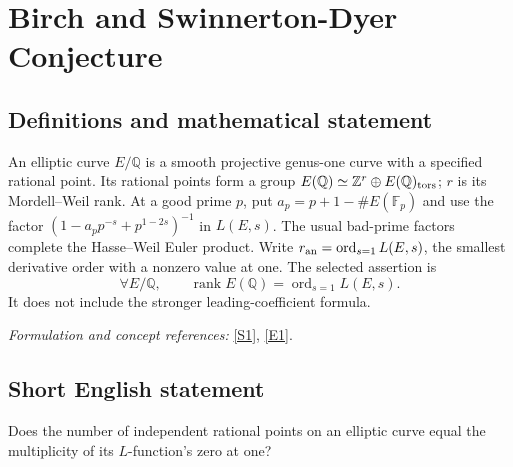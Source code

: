 \documentclass[11pt]{article}
\begin{document}
\section*{\texorpdfstring{Birch and Swinnerton-Dyer Conjecture}{Birch and Swinnerton-Dyer Conjecture}}\label{6}
\subsection{Definitions and mathematical statement}
An elliptic curve $E/{\mathbb{Q}}$ is a smooth projective genus-one curve with a specified rational point. Its rational points form a group $E({\mathbb{Q}})\simeq{\mathbb{Z}}^r\oplus E({\mathbb{Q}})_{\rm tors}$; $r$ is its Mordell--Weil rank. At a good prime $p$, put $a_p=p+1-\#E({\mathbb{F}}_p)$ and use the factor $(1-a_pp^{-s}+p^{1-2s})^{-1}$ in $L(E,s)$. The usual bad-prime factors complete the Hasse--Weil Euler product. Write $r_{\rm an}=\operatorname{ord}_{s=1}L(E,s)$, the smallest derivative order with a nonzero value at one. The selected assertion is
\[
 \forall E/{\mathbb{Q}},\qquad \operatorname{rank}E({\mathbb{Q}})=\operatorname{ord}_{s=1}L(E,s).
\]
It does not include the stronger leading-coefficient formula.
\par\smallskip\textit{Formulation and concept references:} \href{https://www.claymath.org/library/monographs/MPPc.pdf}{[S1]}, \href{https://www.claymath.org/wp-content/uploads/2022/05/birchswin.pdf}{[E1]}.

\subsection{Short English statement}
Does the number of independent rational points on an elliptic curve equal the multiplicity of its $L$-function's zero at one?
\end{document}
